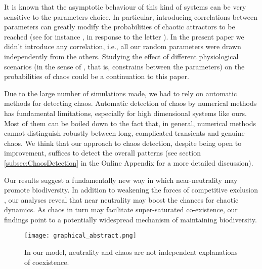 It is known that the asymptotic behaviour of this kind of systems can be very sensitive to the parameters choice. In particular, introducing correlations between parameters can greatly modify the probabilities of chaotic attractors to be reached (see for instance \citet{Huisman2001}, in response to the letter \citet{Schippers2001}). In the present paper we didn't introduce any correlation, i.e., all our random parameters were drawn independently from the others. Studying the effect of different physiological scenarios (in the sense of \citet{Huisman2001}, that is, constrains between the parameters) on the probabilities of chaos could be a continuation to this paper.

Due to the large number of simulations made, we had to rely on automatic methods for detecting chaos. Automatic detection of chaos by numerical methods has fundamental limitations, especially for high dimensional systems like ours. Most of them can be boiled down to the fact that, in general, numerical methods cannot distinguish robustly between long, complicated transients and genuine chaos. We think that our approach to chaos detection, despite being open to improvement, suffices to detect the overall patterns (see section \ref{subsec:ChaosDetection} in the Online Appendix for a more detailed discussion).

Our results suggest a fundamentally new way in which near-neutrality may promote biodiversity. In addition to weakening the forces of competitive exclusion \citep{Scheffer2018}, our analyses reveal that near neutrality may boost the chances for chaotic dynamics. As chaos in turn may facilitate super-saturated co-existence, our findings point to a potentially widespread mechanism of maintaining biodiversity.

\begin{figure}
	\begin{center}
		\texttt{[image: graphical\_abstract.png]}
	\end{center}
	\caption{In our model, neutrality and chaos are not independent explanations of coexistence.}
	\label{fig:GapInKnowledge}
\end{figure}
